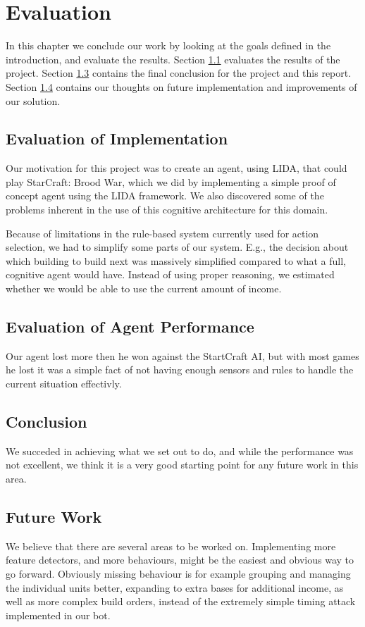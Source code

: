 
\chapter{Evaluation}
In this chapter we conclude our work by looking at the goals defined in the
introduction, and evaluate the results.
Section \ref{sec:evalres} evaluates the results of the project.
Section \ref{sec:conclusion} contains the final conclusion for the project and this report. 
Section \ref{sec:futurework} contains our thoughts on future implementation and improvements of our solution.


\section{Evaluation of Implementation}
\label{sec:evalres}
Our motivation for this project was to create an agent, using LIDA, that could play StarCraft: Brood War, which we did by implementing a simple proof of concept agent using the LIDA framework. We also discovered some of the problems inherent in the use of this cognitive architecture for this domain.

Because of limitations in the rule-based system currently used for action selection, we had to simplify some parts of our system. E.g., the decision about which building to build next was massively simplified compared to what a full, cognitive agent would have. Instead of using proper reasoning, we estimated whether we would be able to use the current amount of income.

\section{Evaluation of Agent Performance}
Our agent lost more then he won against the StartCraft AI, but with most games he lost it was a simple fact of not having enough sensors and rules to handle the current situation effectivly. 

\section{Conclusion}
\label{sec:conclusion}
We succeded in achieving what we set out to do, and while the performance was not excellent, we think it is a very good starting point for any future work in this area.

\section{Future Work}
\label{sec:futurework}
We believe that there are several areas to be worked on. Implementing more feature detectors, and more behaviours, might be the easiest and obvious way to go forward. Obviously missing behaviour is for example grouping and managing the individual units better, expanding to extra bases for additional income, as well as more complex build orders, instead of the extremely simple timing attack implemented in our bot.

